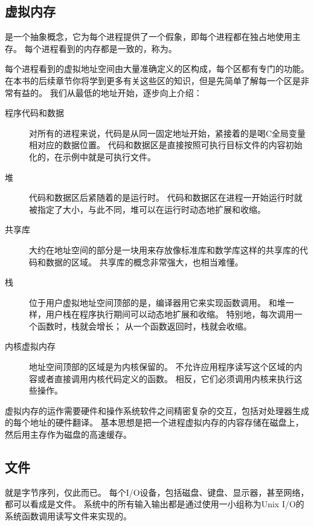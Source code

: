 {    \subsection{虚拟内存}
    {
        是一个抽象概念，它为每个进程提供了一个假象，即每个进程都在独占地使用主存。
        每个进程看到的内存都是一致的，称为。

        每个进程看到的虚拟地址空间由大量准确定义的区构成，每个区都有专门的功能。
        在本书的后续章节你将学到更多有关这些区的知识，但是先简单了解每一个区是非常有益的。
        我们从最低的地址开始，逐步向上介绍：

        \begin{description}
            \item[程序代码和数据]
            {
                对所有的进程来说，代码是从同一固定地址开始，紧接着的是喝C全局变量相对应的数据位置。
                代码和数据区是直接按照可执行目标文件的内容初始化的，在示例中就是可执行文件。
            }
            \item[堆]
            {
                代码和数据区后紧随着的是运行时。
                代码和数据区在进程一开始运行时就被指定了大小，与此不同，堆可以在运行时动态地扩展和收缩。
            }
            \item[共享库]
            {
                大约在地址空间的部分是一块用来存放像标准库和数学库这样的共享库的代码和数据的区域。
                共享库的概念非常强大，也相当难懂。
            }
            \item[栈]
            {
                位于用户虚拟地址空间顶部的是，编译器用它来实现函数调用。
                和堆一样，用户栈在程序执行期间可以动态地扩展和收缩。
                特别地，每次调用一个函数时，栈就会增长；
                从一个函数返回时，栈就会收缩。
            }
            \item[内核虚拟内存]
            {
                地址空间顶部的区域是为内核保留的。
                不允许应用程序读写这个区域的内容或者直接调用内核代码定义的函数。
                相反，它们必须调用内核来执行这些操作。
            }
        \end{description}

        虚拟内存的运作需要硬件和操作系统软件之间精密复杂的交互，包括对处理器生成的每个地址的硬件翻译。
        基本思想是把一个进程虚拟内存的内容存储在磁盘上，然后用主存作为磁盘的高速缓存。
    }

    \subsection{文件}
    {
        就是字节序列，仅此而已。
        每个I/O设备，包括磁盘、键盘、显示器，甚至网络，都可以看成是文件。
        系统中的所有输入输出都是通过使用一小组称为Unix I/O的系统函数调用读写文件来实现的。

}}
